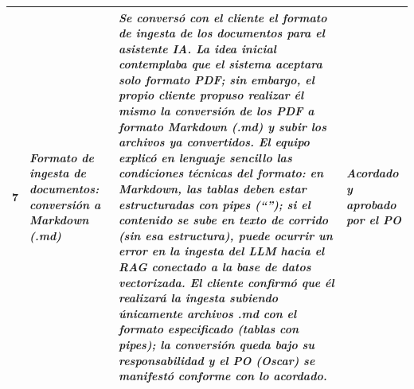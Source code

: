 \documentclass[11pt,a4paper]{article}
\newcommand{\vl}[1]{\textcolor{grisV}{\textit{#1}}}
\begin{document}
{\begin{longtable}{|C{0.8cm}|L{3.0cm}|L{7.6cm}|L{2.8cm}|}
7 & \vl{Formato de ingesta de documentos: conversión a Markdown (.md)} & \vl{Se conversó con el cliente el \textbf{formato de ingesta} de los documentos para el asistente IA. La idea inicial contemplaba que el sistema aceptara \textbf{solo formato PDF}; sin embargo, \textbf{el propio cliente propuso} realizar él mismo la \textbf{conversión de los PDF a formato Markdown (.md)} y subir los archivos ya convertidos. El equipo explicó en lenguaje sencillo las condiciones técnicas del formato: en Markdown, las \textbf{tablas deben estar estructuradas con pipes (``\textbar'')}; si el contenido \textbf{se sube en texto de corrido} (sin esa estructura), \textbf{puede ocurrir un error en la ingesta del LLM hacia el RAG} conectado a la \textbf{base de datos vectorizada}. El cliente \textbf{confirmó que él realizará la ingesta subiendo únicamente archivos .md} con el formato especificado (\textbf{tablas con pipes}); la conversión queda bajo su responsabilidad y el \textbf{PO (Oscar) se manifestó conforme} con lo acordado.} & \vl{\textbf{Acordado y aprobado por el PO}} \\ \hline
\end{longtable}}
\end{document}
